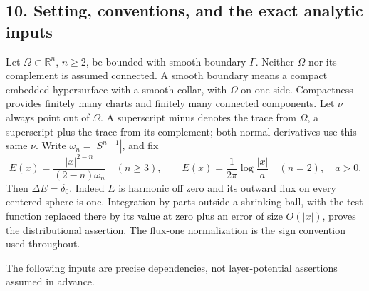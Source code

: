 \documentclass[
  11pt,
]{article}
\makeatletter
\let\ReaderOriginalAnchorStart\hyper@anchorstart
\let\ReaderOriginalAnchorEnd\hyper@anchorend
\let\ReaderPendingAliases\@empty
\def\ReaderArmAliases#1{\gdef\ReaderPendingAliases{#1}}
\def\hyper@anchorstart#1{\ReaderIfNativeAnchorTF{#1}{\ReaderPendingAliases\global\let\ReaderPendingAliases\@empty}{}\ReaderOriginalAnchorStart{#1}}
\makeatother
\begin{document}
\ReaderArmAliases{\ReaderOriginalAnchorStart{AN03-SBD-010}\ReaderOriginalAnchorEnd\begingroup\expandafter\def\csname @currentHref\endcsname{AN03-SBD-010}\label{AN03-SBD-010}\endgroup\ReaderOriginalAnchorStart{an03-sbd-010-setting-conventions-and-the-exact-analytic-inputs}\ReaderOriginalAnchorEnd\begingroup\expandafter\def\csname @currentHref\endcsname{an03-sbd-010-setting-conventions-and-the-exact-analytic-inputs}\label{an03-sbd-010-setting-conventions-and-the-exact-analytic-inputs}\endgroup\ReaderOriginalAnchorStart{10-setting-conventions-and-the-exact-analytic-inputs}\ReaderOriginalAnchorEnd\begingroup\expandafter\def\csname @currentHref\endcsname{10-setting-conventions-and-the-exact-analytic-inputs}\label{10-setting-conventions-and-the-exact-analytic-inputs}\endgroup\ReaderOriginalAnchorStart{setting-conventions-and-the-exact-analytic-inputs}\ReaderOriginalAnchorEnd}
\subsection{10. Setting, conventions, and the exact analytic
inputs}\label{setting-conventions-and-the-exact-analytic-inputs}

Let \(\Omega\subset\mathbb R^n\), \(n\ge2\), be bounded with smooth
boundary \(\Gamma\). Neither \(\Omega\) nor its complement is assumed
connected. A smooth boundary means a compact embedded hypersurface with
a smooth collar, with \(\Omega\) on one side. Compactness provides
finitely many charts and finitely many connected components. Let \(\nu\)
always point out of \(\Omega\). A superscript minus denotes the trace
from \(\Omega\), a superscript plus the trace from its complement; both
normal derivatives use this same \(\nu\). Write \(\omega_n=|S^{n-1}|\),
and fix \[
 E(x)=\frac{|x|^{2-n}}{(2-n)\omega_n}\quad(n\ge3),
 \qquad E(x)=\frac1{2\pi}\log\frac{|x|}{a}\quad(n=2),\quad a>0.
 \tag{LP1}
\] Then \(\Delta E=\delta_0\). Indeed \(E\) is harmonic off zero and its
outward flux on every centered sphere is one. Integration by parts
outside a shrinking ball, with the test function replaced there by its
value at zero plus an error of size \(O(|x|)\), proves the
distributional assertion. The flux-one normalization is the sign
convention used throughout.

The following inputs are precise dependencies, not layer-potential
assertions assumed in advance.
\end{document}
